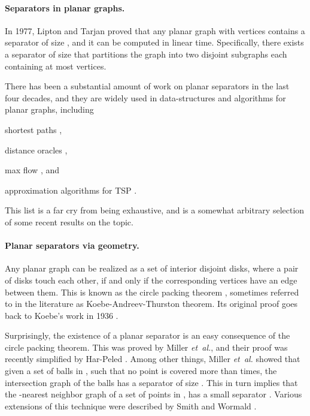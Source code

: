 \InSubmitVer{\documentclass[11pt]{article}}
\numberwithin{figure}{section}
\numberwithin{table}{section}
\numberwithin{equation}{section}
\newcommand{\etal}{\textit{et~al.}\xspace}
\begin{document}
\paragraph{Separators in planar graphs.}

In 1977, Lipton and Tarjan \cite{lt-stpg-77, lt-stpg-79} proved that
any planar graph with  vertices contains a separator of size
, and it can be computed in linear time.
Specifically, there exists a separator of size  that
partitions the graph into two disjoint subgraphs each containing at
most  vertices.

There has been a substantial amount of work on planar separators in
the last four decades, and they are widely used in data-structures and
algorithms for planar graphs, including
\begin{inparaenum}[(i)]
    \item shortest paths \cite{fr-pgnwe-06},
    \item distance oracles \cite{svy-dosg-09},
    \item max flow \cite{ek-ltamf-13}, and
    \item approximation algorithms for TSP \cite{k-ltast-08}.
\end{inparaenum}
This list is a far cry from being exhaustive, and is a somewhat
arbitrary selection of some recent results on the topic.


\paragraph{Planar separators via geometry.}

Any planar graph can be realized as a set of interior disjoint disks,
where a pair of disks touch each other, if and only if the
corresponding vertices have an edge between them. This is known as the
circle packing theorem \cite{pa-cg-95}, sometimes referred to in the
literature as Koebe-Andreev-Thurston theorem. Its original proof goes
back to Koebe's work in 1936 \cite{k-kdka-36}.

Surprisingly, the existence of a planar separator is an easy
consequence of the circle packing theorem. This was proved by Miller
\etal \cite{mttv-sspnng-97}, and their proof was recently simplified
by Har-Peled \cite{h-speps-11}. Among other things, Miller \etal
showed that given a set of  balls in , such that no point is
covered more than  times, the intersection graph of the balls has a
separator of size . This in turn implies
that the -nearest neighbor graph of a set of points in , has
a small separator \cite{mttv-sspnng-97, h-speps-11}.  Various
extensions of this technique were described by Smith and Wormald
\cite{sw-gsta-98}.
\end{document}
